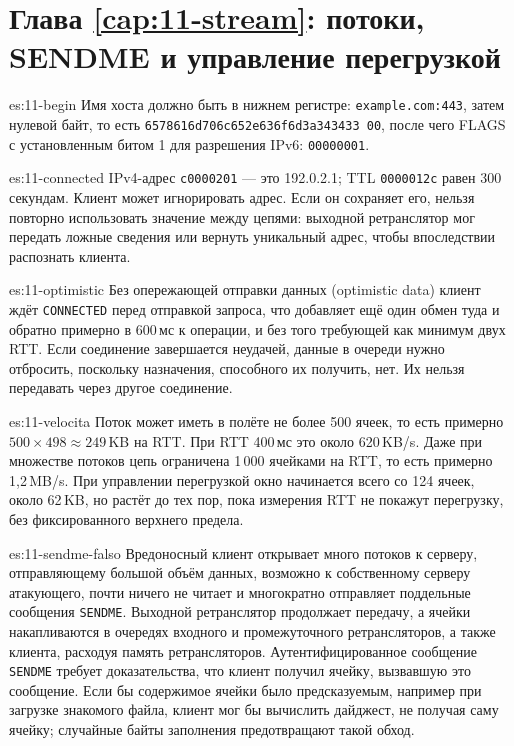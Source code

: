 \section*{Глава \ref{cap:11-stream}: потоки, SENDME и управление перегрузкой}

\begin{soluzione}{es:11-begin}
Имя хоста должно быть в нижнем регистре: \texttt{example.com:443}, затем нулевой байт, то есть \texttt{6578616d706c652e636f6d3a343433 00}, после чего FLAGS с установленным битом 1 для разрешения IPv6: \texttt{00000001}.
\end{soluzione}

\begin{soluzione}{es:11-connected}
IPv4-адрес \texttt{c0000201} — это 192.0.2.1; TTL \texttt{0000012c} равен 300 секундам. Клиент может игнорировать адрес. Если он сохраняет его, нельзя повторно использовать значение между цепями: выходной ретранслятор мог передать ложные сведения или вернуть уникальный адрес, чтобы впоследствии распознать клиента.
\end{soluzione}

\begin{soluzione}{es:11-optimistic}
Без опережающей отправки данных (optimistic data) клиент ждёт \texttt{CONNECTED} перед отправкой запроса, что добавляет ещё один обмен туда и обратно примерно в 600\,мс к операции, и без того требующей как минимум двух RTT. Если соединение завершается неудачей, данные в очереди нужно отбросить, поскольку назначения, способного их получить, нет. Их нельзя передавать через другое соединение.
\end{soluzione}

\begin{soluzione}{es:11-velocita}
Поток может иметь в полёте не более 500 ячеек, то есть примерно $500 \times 498 \approx 249$\,KB на RTT. При RTT 400\,мс это около 620\,KB/s. Даже при множестве потоков цепь ограничена 1\,000 ячейками на RTT, то есть примерно 1,2\,MB/s. При управлении перегрузкой окно начинается всего со 124 ячеек, около 62\,KB, но растёт до тех пор, пока измерения RTT не покажут перегрузку, без фиксированного верхнего предела.
\end{soluzione}

\begin{soluzione}{es:11-sendme-falso}
Вредоносный клиент открывает много потоков к серверу, отправляющему большой объём данных, возможно к собственному серверу атакующего, почти ничего не читает и многократно отправляет поддельные сообщения \texttt{SENDME}. Выходной ретранслятор продолжает передачу, а ячейки накапливаются в очередях входного и промежуточного ретрансляторов, а также клиента, расходуя память ретрансляторов. Аутентифицированное сообщение \texttt{SENDME} требует доказательства, что клиент получил ячейку, вызвавшую это сообщение. Если бы содержимое ячейки было предсказуемым, например при загрузке знакомого файла, клиент мог бы вычислить дайджест, не получая саму ячейку; случайные байты заполнения предотвращают такой обход.
\end{soluzione}

